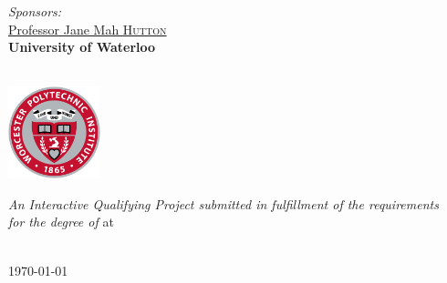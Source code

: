 \documentclass[
11pt, %
english, %
singlespacing, %
headsepline, %
]{MastersDoctoralThesis} %
\begin{document}
\begin{titlepage}
\begin{center}
\begin{minipage}[t]{0.4\textwidth}
\begin{flushright}
\emph{Sponsors:} \\
\href{https://uwaterloo.ca/architecture/profile/j2hutton}{Professor Jane Mah \textsc{Hutton}}\\
{\small \bfseries University of Waterloo}\vspace{0.4cm}


\end{flushright}
\end{minipage}\\[1.5cm]

\includegraphics[width=0.2\textwidth]{Images/university.png}

\vfill

\large \textit{An Interactive Qualifying Project submitted in fulfillment of the requirements\\ for the degree of \degreename} at\\[0.3cm] %
\groupname \\[2cm] %
 
\vfill

{\large \monthyeardate\today}\\[4cm] %
 
\vfill
\end{center}
\end{titlepage}

\end{document}
